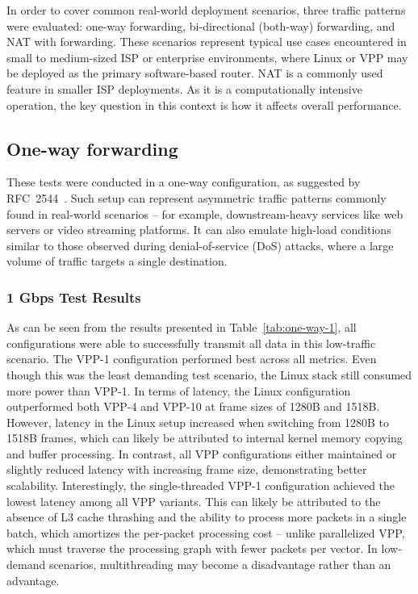 In order to cover common real-world deployment scenarios, three traffic patterns were evaluated: one-way forwarding, bi-directional (both-way) forwarding, and NAT with forwarding.
These scenarios represent typical use cases encountered in small to medium-sized ISP or enterprise environments, where Linux or VPP may be deployed as the primary software-based router.
NAT is a commonly used feature in smaller ISP deployments. As it is a computationally intensive operation, the key question in this context is how it affects overall performance.

\subsection{One-way forwarding}

These tests were conducted in a one-way configuration, as suggested by RFC~2544~\cite{rfc2544}.
Such setup can represent asymmetric traffic patterns commonly found in real-world scenarios -- for example, downstream-heavy services like web servers or video streaming platforms.
It can also emulate high-load conditions similar to those observed during denial-of-service (DoS) attacks, where a large volume of traffic targets a single destination. 

\subsubsection{1 Gbps Test Results}

As can be seen from the results presented in Table~\ref{tab:one-way-1}, all configurations were able to successfully transmit all data in this low-traffic scenario.
The VPP-1 configuration performed best across all metrics. Even though this was the least demanding test scenario, the Linux stack still consumed more power than VPP-1.
In terms of latency, the Linux configuration outperformed both VPP-4 and VPP-10 at frame sizes of 1280B and 1518B.
However, latency in the Linux setup increased when switching from 1280B to 1518B frames, which can likely be attributed to internal kernel memory copying and buffer processing.
In contrast, all VPP configurations either maintained or slightly reduced latency with increasing frame size, demonstrating better scalability.
Interestingly, the single-threaded VPP-1 configuration achieved the lowest latency among all VPP variants.
This can likely be attributed to the absence of L3 cache thrashing and the ability to process more packets in a single batch, which amortizes the per-packet processing cost -- unlike parallelized VPP, 
which must traverse the processing graph with fewer packets per vector.
In low-demand scenarios, multithreading may become a disadvantage rather than an advantage.

